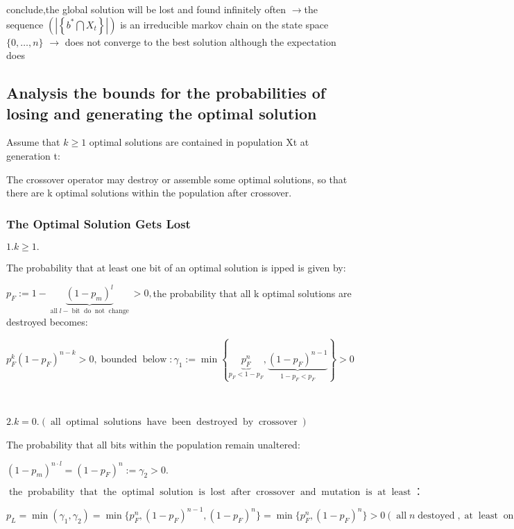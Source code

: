 \documentclass{article}
\newcommand{\assign}{:=}
\newcommand{\tmop}[1]{\ensuremath{\operatorname{#1}}}
\begin{document}
conclude,the global solution will be lost and found infinitely often
$\rightarrow$the sequence $\left( \left| \left\{ b^{\ast} \bigcap X_t \right\}
\right| \right)$ is an irreducible markov chain on the state space $\{ 0,
\ldots, n \}$ $\rightarrow$ does not converge to the best solution although
the expectation does

\subsection{Analysis the bounds for the probabilities of losing and generating
the optimal solution}

Assume that $k \geqslant 1$ optimal solutions are contained in population Xt
at generation t:

The crossover operator may destroy or assemble some optimal solutions, so that
there are k optimal solutions within the population after crossover.

\subsubsection{The Optimal Solution Gets Lost}

$1. k \geqslant 1.$

The probability that at least one bit of an optimal solution is ipped is
given by:

$p_F \assign 1 - \underset{\tmop{all} l - \tmop{bit} \tmop{do} \tmop{not}
\tmop{change}}{\underbrace{(1 - p_m)^l}} > 0,$the probability that all k
optimal solutions are destroyed becomes:

$p_F^k (1 - p_F)^{n - k} > 0, \tmop{bounded} \tmop{below} : \gamma_1 \assign
\min \left\{ \underset{p_F < 1 - p_F}{\underbrace{p_F^n}}, \underset{1 - p_F <
p_F}{\underbrace{(1 - p_F )^{n - 1}}} \right\} > 0$

\

$2. k = 0. (\tmop{all} \tmop{optimal} \tmop{solutions} \tmop{have}
\tmop{been} \tmop{destroyed} \tmop{by} \tmop{crossover})$ \

The probability that all bits within the population remain unaltered:

$(1 - p_m)^{n \cdot l} = (1 - p_F )^n \assign \gamma_2 > 0.$

$\tmop{the} \tmop{probability} \tmop{that} \tmop{the} \tmop{optimal}
\tmop{solution} \tmop{is} \tmop{lost} \tmop{after} \tmop{crossover} \tmop{and}
\tmop{mutation} \tmop{is} \tmop{at} \tmop{least} ：$

$p_L = \min (\gamma_1, \gamma_2) = \min \{ p_F^n, (1 - p_F )^{n - 1}, (1 - p_F
)^n \} = \min \{ p_F^n, (1 - p_F )^n \} > 0 (\tmop{all} n \tmop{destoyed},
\tmop{at} \tmop{least} \tmop{one} \tmop{not}, \tmop{all} \tmop{not})$
\end{document}
